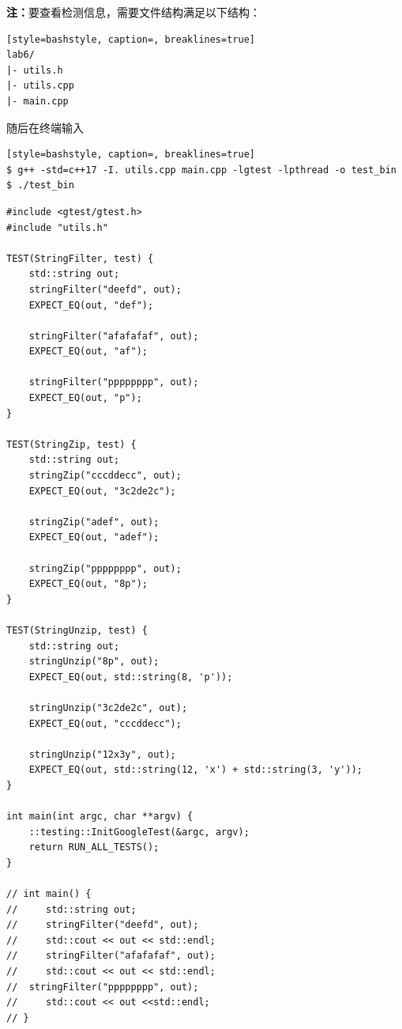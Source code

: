 \documentclass[dvipsnames, svgnames,a4paper,11pt]{article}
\begin{document}
\textbf{注：}要查看检测信息，需要文件结构满足以下结构：
\begin{lstlisting}[style=bashstyle, caption=, breaklines=true]
lab6/
|- utils.h
|- utils.cpp
|- main.cpp
\end{lstlisting}
随后在终端输入
\begin{lstlisting}[style=bashstyle, caption=, breaklines=true]
$ g++ -std=c++17 -I. utils.cpp main.cpp -lgtest -lpthread -o test_bin
$ ./test_bin
\end{lstlisting}
\begin{lstlisting}[style=cppstyle, caption=utils.cpp,breaklines=true]
#include <gtest/gtest.h>
#include "utils.h"

TEST(StringFilter, test) {
	std::string out;
	stringFilter("deefd", out);
	EXPECT_EQ(out, "def");

	stringFilter("afafafaf", out);
	EXPECT_EQ(out, "af");

	stringFilter("pppppppp", out);
	EXPECT_EQ(out, "p");
}

TEST(StringZip, test) {
	std::string out;
	stringZip("cccddecc", out);
	EXPECT_EQ(out, "3c2de2c");

	stringZip("adef", out);
	EXPECT_EQ(out, "adef");

	stringZip("pppppppp", out);
	EXPECT_EQ(out, "8p");
}

TEST(StringUnzip, test) {
	std::string out;
	stringUnzip("8p", out);
	EXPECT_EQ(out, std::string(8, 'p'));

	stringUnzip("3c2de2c", out);
	EXPECT_EQ(out, "cccddecc");

	stringUnzip("12x3y", out);
	EXPECT_EQ(out, std::string(12, 'x') + std::string(3, 'y'));
}

int main(int argc, char **argv) {
	::testing::InitGoogleTest(&argc, argv);
	return RUN_ALL_TESTS();
}

// int main() {
//     std::string out;
//     stringFilter("deefd", out); 
//     std::cout << out << std::endl;
//     stringFilter("afafafaf", out);
//     std::cout << out << std::endl;
// 	stringFilter("pppppppp", out);
//     std::cout << out <<std::endl;
// }
\end{lstlisting}
\end{document}
